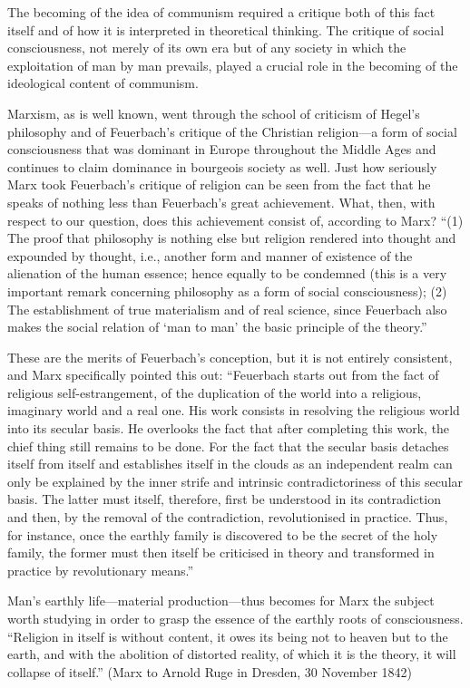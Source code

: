 \documentclass[12pt,a4paper,openany]{book}
\begin{document}
The becoming of the idea of communism required a critique both of this fact itself and of how it is interpreted in theoretical thinking. The critique of social consciousness, not merely of its own era but of any society in which the exploitation of man by man prevails, played a crucial role in the becoming of the ideological content of communism.

Marxism, as is well known, went through the school of criticism of Hegel's philosophy and of Feuerbach's critique of the Christian religion—a form of social consciousness that was dominant in Europe throughout the Middle Ages and continues to claim dominance in bourgeois society as well. Just how seriously Marx took Feuerbach's critique of religion can be seen from the fact that he speaks of nothing less than Feuerbach's great achievement. What, then, with respect to our question, does this achievement consist of, according to Marx? “(1) The proof that philosophy is nothing else but religion rendered into thought and expounded by thought, i.e., another form and manner of existence of the alienation of the human essence; hence equally to be condemned (this is a very important remark concerning philosophy as a form of social consciousness); (2) The establishment of true materialism and of real science, since Feuerbach also makes the social relation of ‘man to man’ the basic principle of the theory.”

These are the merits of Feuerbach's conception, but it is not entirely consistent, and Marx specifically pointed this out: “Feuerbach starts out from the fact of religious self-estrangement, of the duplication of the world into a religious, imaginary world and a real one. His work consists in resolving the religious world into its secular basis. He overlooks the fact that after completing this work, the chief thing still remains to be done. For the fact that the secular basis detaches itself from itself and establishes itself in the clouds as an independent realm can only be explained by the inner strife and intrinsic contradictoriness of this secular basis. The latter must itself, therefore, first be understood in its contradiction and then, by the removal of the contradiction, revolutionised in practice. Thus, for instance, once the earthly family is discovered to be the secret of the holy family, the former must then itself be criticised in theory and transformed in practice by revolutionary means.”

Man’s earthly life—material production—thus becomes for Marx the subject worth studying in order to grasp the essence of the earthly roots of consciousness. “Religion in itself is without content, it owes its being not to heaven but to the earth, and with the abolition of distorted reality, of which it is the theory, it will collapse of itself.” (Marx to Arnold Ruge in Dresden, 30 November 1842)
\end{document}
